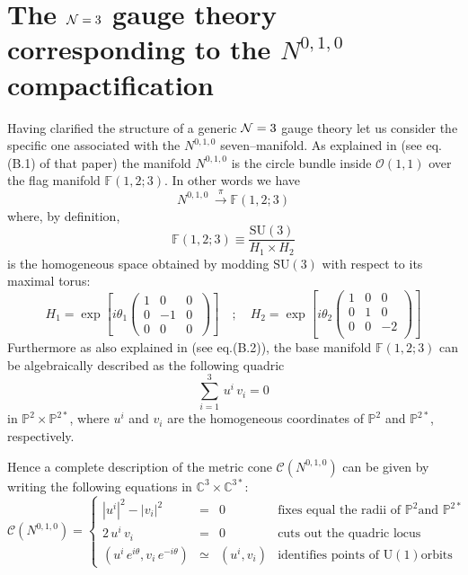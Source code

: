\documentclass[a4paper,12pt]{article}
\def\n010{N^{0,1,0}}
\begin{document}
\section{The ${\cal N}=3$ gauge theory corresponding to the
$\n010$ compactification}\label{theoryofN010}
Having clarified the structure of a generic ${\cal N}=3$ gauge
theory let us consider the specific one associated with the
$\n010$ seven--manifold.
As explained in \cite{3dcft} (see eq.(B.1) of that paper)
the manifold $\n010$ is the circle bundle inside $\mathcal{O}(1,1)$
over the flag manifold $\mathbb{F}(1,2;3)$. In other words we have
\begin{equation}
  \n010 \, \stackrel{\pi}{\longrightarrow}\mathbb{F}(1,2;3)
\label{fibrsuflag}
\end{equation}
where, by definition,
\begin{equation}
  \mathbb{F}(1,2;3) \equiv \frac{\mathrm{SU(3)}}{H_1 \times H_2}
\label{flagga}
\end{equation}
is  the homogeneous space obtained by modding $\mathrm{SU(3)}$
with respect to its maximal torus:
\begin{equation}
  H_1 = \exp \left[i \theta_1 \left( \begin{array}{ccc}
    1 & 0 & 0 \\
    0 & -1 & 0 \\
    0 & 0 & 0 \
  \end{array}\right) \right] \quad ; \quad
   H_2 = \exp \left[i \theta_2 \left(\begin{array}{ccc}
     1 & 0 & 0 \\
     0 & 1 & 0 \\
     0 & 0 & -2 \\
   \end{array} \right) \right]
\label{maxtor}
\end{equation}
Furthermore as also explained in \cite{3dcft} (see
eq.(B.2)), the base manifold $\mathbb{F}(1,2;3)$ can be algebraically
described as the following quadric
\begin{equation}
  \sum_{i=1}^{3} \, u^i \, v_i = 0
\label{vanlocus}
\end{equation}
in $\mathbb{P}^2 \times \mathbb{P}^{2*}$, where $u^i$ and $v_i$ are
the homogeneous coordinates of
$\mathbb{P}^2$ and $\mathbb{P}^{2*}$, respectively.
\par
Hence a complete description of the metric cone $\mathcal{C}\left(
\n010\right) $ can be given by writing the following equations
in $ \mathbb{C}^3 \times \mathbb{C}^{3*}$:
\begin{equation}
 \mathcal{C}\left(
 \n010\right)= \left \{ \begin{array}{rcll}
    |u^i|^2-|v_i|^2 & = & 0 & \mbox{fixes equal the radii of $\mathbb{P}^2$
    and $\mathbb{P}^{2*}$}  \\
    2 \, u^i \, v_i & = & 0 & \mbox{cuts out the quadric locus} \\
    \left( u^i \, e^{i\theta} , v_i \, e^{-i\theta}\right)
    &\simeq &\left( u^i,v_i\right) &\mbox{identifies points of $\mathrm{U(1)}$
    orbits}\
  \end{array}\right.
\label{metrcon}
\end{equation}
\end{document}
